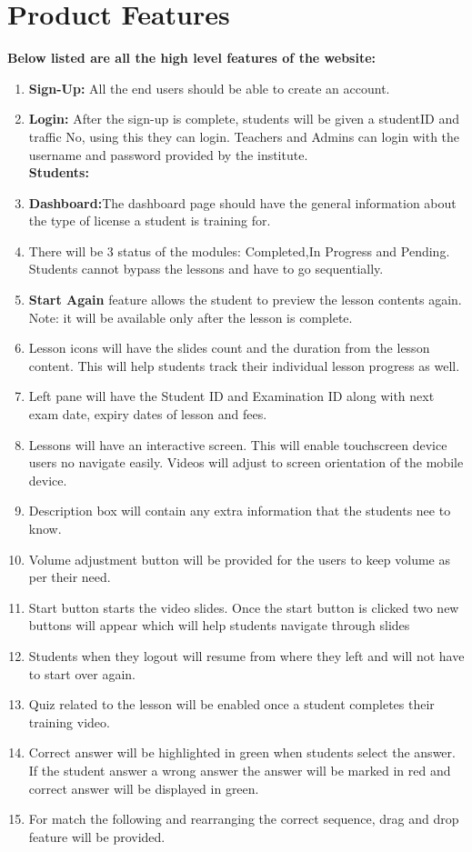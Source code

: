 \documentclass{article}
\begin{document}
\section{Product Features}
\textbf{Below listed are all the high level features of the website:}
\begin{enumerate}
    \item \textbf{Sign-Up:} All the end users should be able to create an account.
    \item \textbf{Login:} After the sign-up is complete, students will be given a studentID and traffic No, using this they can login. Teachers and Admins can login with the username and password provided by the institute.\\[0.5ex]
    
    \textbf{Students:}
    \item \textbf{Dashboard:}The dashboard page should have the general information about the type of license a student is training for.
    \item There will be 3 status of the modules: Completed,In Progress and Pending. Students cannot bypass the lessons and have to go sequentially.
    \item \textbf{Start Again} feature allows the student to preview the lesson contents again. Note: it will be available only after the lesson is complete.
    \item Lesson icons will have the slides count and the duration from the lesson content. This will help students track their individual lesson progress as well.
    \item Left pane will have the Student ID and Examination ID along with next exam date, expiry dates of lesson and fees.
    \item Lessons will have an interactive screen. This will enable touchscreen device users no navigate easily. Videos will adjust to screen orientation of the mobile device.
    \item Description box will contain any extra information that the students nee to know.
    \item Volume adjustment button will be provided for the users to keep volume as per their need.
    \item Start button starts the video slides. Once the start button is clicked two new buttons will appear which will help students navigate through slides
    \item Students when they logout will resume from where they left and will not have to start over again.
    \item Quiz related to the lesson will be enabled once a student completes their training video.
    \item Correct answer will be highlighted in green when students select the answer. If the student answer a wrong answer the answer will be marked in red and correct answer will be displayed in green.
    \item For match the following and rearranging the correct sequence, drag and drop feature will be provided.\\[0.5ex]
    

\end{enumerate}
\end{document}
